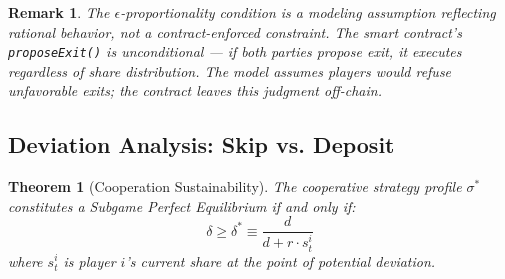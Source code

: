 \documentclass[12pt]{article}
\newtheorem{theorem}{Theorem}
\newtheorem{remark}{Remark}
\begin{document}
\begin{remark}
The $\epsilon$-proportionality condition is a modeling assumption reflecting rational behavior, not a contract-enforced constraint. The smart contract's \texttt{proposeExit()} is unconditional --- if both parties propose exit, it executes regardless of share distribution. The model assumes players would refuse unfavorable exits; the contract leaves this judgment off-chain.
\end{remark}

\subsection{Deviation Analysis: Skip vs. Deposit}

\begin{theorem}[Cooperation Sustainability]
\label{thm:cooperation}
The cooperative strategy profile $\sigma^*$ constitutes a Subgame Perfect Equilibrium if and only if:
\[
\delta \geq \delta^* \equiv \frac{d}{d + r \cdot s_t^i}
\]
where $s_t^i$ is player $i$'s current share at the point of potential deviation.
\end{theorem}
\end{document}
